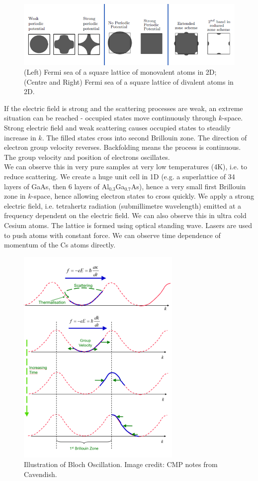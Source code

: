 \documentclass[a4paper]{article}
\begin{document}
\begin{figure}[H]
    \centering
    \includegraphics[width=\linewidth]{squarelattice.PNG}
    \caption{(Left) Fermi sea of a square lattice
of monovalent atoms in 2D; (Centre and Right) Fermi sea of a square lattice of divalent atoms in 2D. \cite{simon2013oxford}}
\end{figure}
\begin{Note}
If the electric field is strong and the scattering processes are weak, an extreme situation can be reached - occupied states move continuously through $k$-space. Strong electric field and weak scattering causes occupied states to steadily increase in $k$. The filled states cross into second Brillouin zone. The direction of electron group velocity reverses. Backfolding means the process is continuous. The group velocity and position of electrons oscillates.\\[5pt]
We can observe this in very pure samples at very low temperatures (4K), i.e. to reduce scattering. We create a huge unit cell in 1D (e.g. a superlattice of 34 layers of GaAs, then 6 layers of Al$_{0.3}$Ga$_{0.7}$As), hence a very small first Brillouin zone in $k$-space, hence allowing electron states to cross quickly. We apply a strong electric field, i.e. tetrahertz radiation (submillimetre wavelength) emitted at a frequency dependent on the electric field. We can also observe this in ultra cold Cesium atoms. The lattice is formed using optical standing wave. Lasers are used to push atoms with constant force. We can observe time dependence of momentum of the Cs atoms directly.
\end{Note}
\begin{figure}[H]
    \centering
    \includegraphics{blochoscillations.PNG}
    \caption{Illustration of Bloch Oscillation. Image credit: CMP notes from Cavendish.}
\end{figure}
\end{document}
